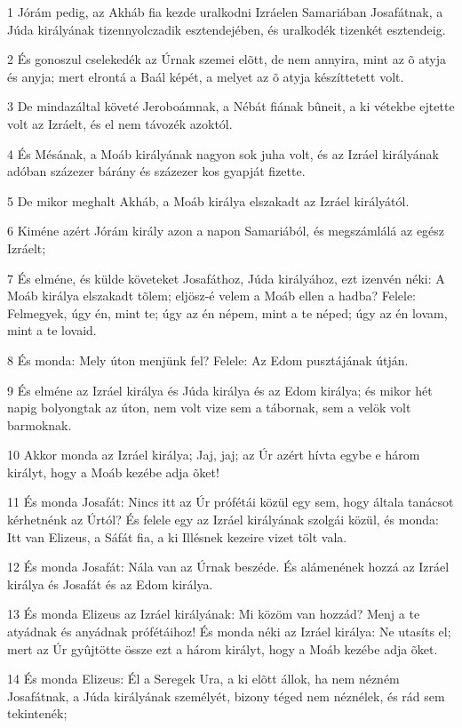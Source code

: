 \par 1 Jórám pedig, az Akháb  fia kezde uralkodni Izráelen Samariában Josafátnak, a Júda királyának tizennyolczadik esztendejében, és uralkodék tizenkét esztendeig.
\par 2 És gonoszul cselekedék az Úrnak szemei elõtt, de nem annyira, mint az õ atyja és anyja; mert elrontá a Baál képét, a melyet az õ atyja készíttetett volt.
\par 3 De mindazáltal követé Jeroboámnak, a Nébát fiának bûneit, a ki vétekbe ejtette volt az Izráelt, és el nem távozék azoktól.
\par 4 És Mésának, a Moáb királyának nagyon sok juha volt, és az Izráel királyának adóban százezer bárány és százezer kos gyapját fizette.
\par 5 De mikor meghalt Akháb, a Moáb királya elszakadt az Izráel királyától.
\par 6 Kiméne azért Jórám király azon a napon Samariából, és megszámlálá az egész Izráelt;
\par 7 És elméne, és külde követeket Josafáthoz, Júda királyához, ezt izenvén néki: A Moáb királya elszakadt tõlem; eljösz-é velem a Moáb ellen a hadba? Felele: Felmegyek, úgy én, mint te; úgy az én népem, mint a te néped; úgy az én lovam, mint a te lovaid.
\par 8 És monda: Mely úton menjünk fel? Felele: Az Edom pusztájának útján.
\par 9 És elméne az Izráel királya és Júda királya és az Edom királya; és mikor hét napig bolyongtak az úton, nem volt vize sem a tábornak, sem a velök volt barmoknak.
\par 10 Akkor monda az Izráel királya; Jaj, jaj; az Úr azért hívta egybe e három királyt, hogy a Moáb kezébe adja õket!
\par 11 És monda Josafát: Nincs itt az Úr prófétái közül egy sem, hogy általa tanácsot kérhetnénk az Úrtól? És felele egy az Izráel királyának szolgái közül, és monda: Itt van Elizeus, a Sáfát fia, a ki Illésnek kezeire vizet tölt vala.
\par 12 És monda Josafát: Nála van az Úrnak beszéde. És alámenének hozzá az Izráel királya és Josafát és az Edom királya.
\par 13 És monda Elizeus az Izráel királyának: Mi közöm van hozzád? Menj a te atyádnak és anyádnak prófétáihoz! És monda néki az Izráel királya: Ne utasíts el; mert az Úr gyûjtötte össze ezt a három királyt, hogy a Moáb kezébe adja õket.
\par 14 És monda Elizeus: Él a Seregek Ura, a ki elõtt állok, ha nem nézném Josafátnak, a Júda királyának személyét, bizony téged nem néznélek, és rád sem tekintenék;
